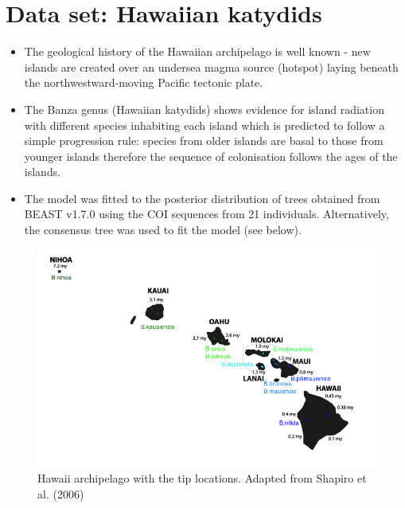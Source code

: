 \documentclass[a4paper]{article}
\begin{document}
\newpage
\setlength\abovecaptionskip{-12pt}
\section{Data set: Hawaiian katydids}
\begin{itemize}
\renewcommand{\labelitemi}{$\bullet$}
\item The geological history of the Hawaiian archipelago is well known - new islands are created over an undersea magma source (hotspot) laying beneath the northwestward-moving Pacific tectonic plate.
\item The Banza genus (Hawaiian katydids) shows evidence for island radiation with different species inhabiting each island which is predicted to follow a simple progression rule: species from older islands are basal to those from younger islands therefore the sequence of colonisation follows the ages of the islands.
\item The model was fitted to the posterior distribution of trees obtained from BEAST v1.7.0 using the COI sequences from 21 individuals\cite{hawaii}.
Alternatively, the consensus tree was used to fit the model (see below).
\end{itemize}
\begin{figure}[h!]
\begin{center}
\includegraphics{figures/hawaii.png}
\caption{Hawaii archipelago with the tip locations.
Adapted from Shapiro et al. (2006)\cite{hawaii}}
\end{center}
\end{figure}


\newpage
\end{document}
